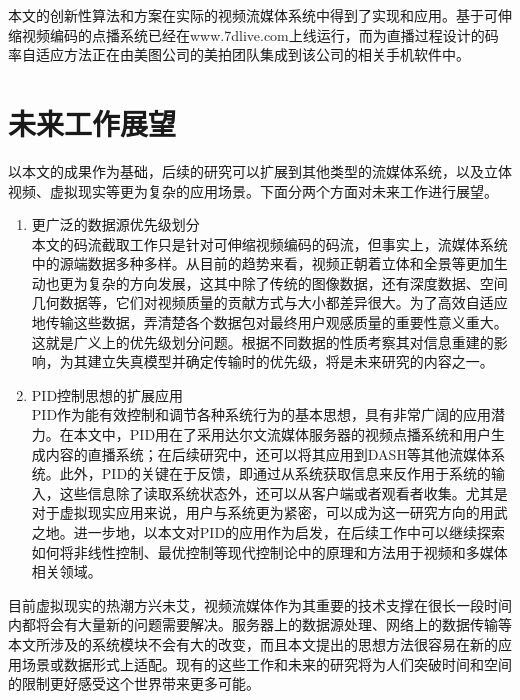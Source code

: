 本文的创新性算法和方案在实际的视频流媒体系统中得到了实现和应用。基于可伸缩视频编码的点播系统已经在www.7dlive.com上线运行，而为直播过程设计的码率自适应方法正在由美图公司的美拍团队集成到该公司的相关手机软件中。

\section{未来工作展望}

以本文的成果作为基础，后续的研究可以扩展到其他类型的流媒体系统，以及立体视频、虚拟现实等更为复杂的应用场景。下面分两个方面对未来工作进行展望。
\begin{enumerate}
\item {更广泛的数据源优先级划分} \\
本文的码流截取工作只是针对可伸缩视频编码的码流，但事实上，流媒体系统中的源端数据多种多样。从目前的趋势来看，视频正朝着立体和全景等更加生动也更为复杂的方向发展，这其中除了传统的图像数据，还有深度数据、空间几何数据等，它们对视频质量的贡献方式与大小都差异很大。为了高效自适应地传输这些数据，弄清楚各个数据包对最终用户观感质量的重要性意义重大。这就是广义上的优先级划分问题。根据不同数据的性质考察其对信息重建的影响，为其建立失真模型并确定传输时的优先级，将是未来研究的内容之一。
\item {PID控制思想的扩展应用} \\
PID作为能有效控制和调节各种系统行为的基本思想，具有非常广阔的应用潜力。在本文中，PID用在了采用达尔文流媒体服务器的视频点播系统和用户生成内容的直播系统；在后续研究中，还可以将其应用到DASH等其他流媒体系统。此外，PID的关键在于反馈，即通过从系统获取信息来反作用于系统的输入，这些信息除了读取系统状态外，还可以从客户端或者观看者收集。尤其是对于虚拟现实应用来说，用户与系统更为紧密，可以成为这一研究方向的用武之地。进一步地，以本文对PID的应用作为启发，在后续工作中可以继续探索如何将非线性控制、最优控制等现代控制论中的原理和方法用于视频和多媒体相关领域。
\end{enumerate}

目前虚拟现实的热潮方兴未艾，视频流媒体作为其重要的技术支撑在很长一段时间内都将会有大量新的问题需要解决。服务器上的数据源处理、网络上的数据传输等本文所涉及的系统模块不会有大的改变，而且本文提出的思想方法很容易在新的应用场景或数据形式上适配。现有的这些工作和未来的研究将为人们突破时间和空间的限制更好感受这个世界带来更多可能。